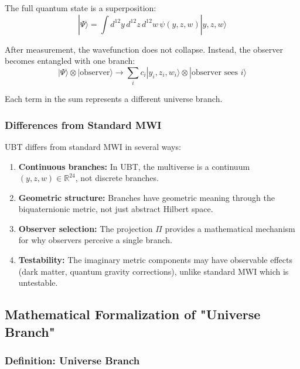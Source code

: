 The full quantum state is a superposition:
\begin{equation}
|\Psi\rangle = \int d^{12}y\,d^{12}z\,d^{12}w \, \psi(y, z, w) |y, z, w\rangle
\end{equation}

After measurement, the wavefunction does not collapse. Instead, the observer becomes entangled with one branch:
\begin{equation}
|\Psi\rangle \otimes |\text{observer}\rangle \to \sum_i c_i |y_i, z_i, w_i\rangle \otimes |\text{observer sees } i\rangle
\end{equation}

Each term in the sum represents a different universe branch.

\subsubsection{Differences from Standard MWI}

UBT differs from standard MWI in several ways:

\begin{enumerate}
\item \textbf{Continuous branches:} In UBT, the multiverse is a continuum $(y, z, w) \in \mathbb{R}^{24}$, not discrete branches.

\item \textbf{Geometric structure:} Branches have geometric meaning through the biquaternionic metric, not just abstract Hilbert space.

\item \textbf{Observer selection:} The projection $\Pi$ provides a mathematical mechanism for why observers perceive a single branch.

\item \textbf{Testability:} The imaginary metric components may have observable effects (dark matter, quantum gravity corrections), unlike standard MWI which is untestable.
\end{enumerate}

\subsection{Mathematical Formalization of "Universe Branch"}

\subsubsection{Definition: Universe Branch}

